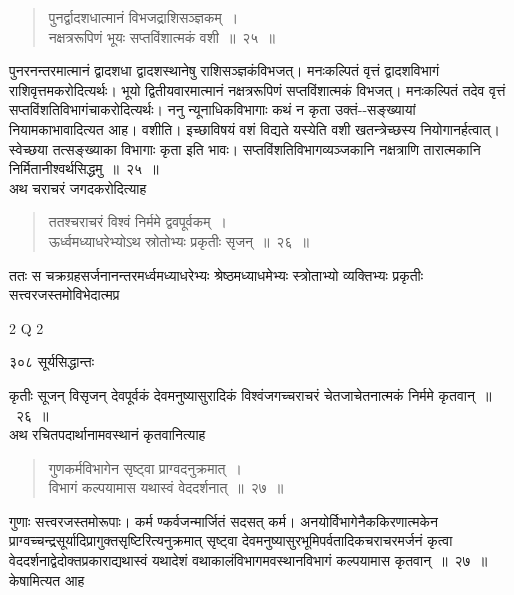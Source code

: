 \documentclass[11pt, openany]{book}
\begin{document}
 \begin{quote}
{\ssi पुनर्द्वादशधात्मानं विभजद्राशिसञ्ज्ञकम्~।\\
नक्षत्ररूपिणं भूयः सप्तविंशात्मकं वशी~॥~२५~॥}
\end{quote}

 पुनरनन्तरमात्मानं द्वादशधा द्वादशस्थानेषु राशिसञ्ज्ञकंविभजत्। मनःकल्पितं वृत्तं द्वादशविभागं राशिवृत्तमकरोदित्यर्थः। भूयो द्वितीयवारमात्मानं नक्षत्ररूपिणं सप्तविंशात्मकं विभजत्। मनःकल्पितं तदेव वृत्तं सप्तविंशतिविभागंचाकरोदित्यर्थः। ननु न्यूनाधिकविभागाः कथं न कृता उक्तं-\/-सङ्ख्यायां नियामकाभावादित्यत आह। वशीति। इच्छाविषयं वशं विद्यते यस्येति वशी खतन्त्रेच्छस्य नियोगानर्हत्वात्। स्वेच्छया तत्सङ्ख्याका विभागाः कृता इति भावः। सप्तविंशतिविभागव्यञ्जकानि नक्षत्राणि तारात्मकानि निर्मितानीश्वर्थसिद्धमु~॥~२५~॥\\
\noindent अथ चराचरं जगदकरोदित्याह \textendash

\begin{quote}
{\ssi ततश्चराचरं विश्वं निर्ममे द्ववपूर्वकम्~।\\
ऊर्ध्वमध्याधरेभ्योऽथ स्रोतोभ्यः प्रकृतीः सृजन्~॥~२६~॥ }
\end{quote}
 ततः स चक्रग्रहसर्जनानन्तरमर्ध्वमध्याधरेभ्यः श्रेष्ठमध्याधमेभ्यः स्त्रोताभ्यो व्यक्तिभ्यः प्रकृतीः सत्त्वरजस्तमोविभेदात्मप्र \textendash


{\tiny{2 Q 2}}


\newpage


\noindent ३०८ \hspace{3cm} सूर्यसिद्धान्तः
\vspace{1cm}


\noindent कृतीः सूजन् विसृजन् देवपूर्वकं देवमनुष्यासुरादिकं विश्वंजगच्चराचरं चेतजाचेतनात्मकं निर्ममे कृतवान्~॥~२६~॥ \\
\noindent अथ रचितपदार्थानामवस्थानं कृतवानित्याह \textendash

\begin{quote}
{\ssi गुणकर्मविभागेन सृष्ट्वा प्राग्वदनुक्रमात्~। \\
विभागं कल्पयामास यथास्वं वेददर्शनात्~॥~२७~॥ }
\end{quote}
 गुणाः सत्त्वरजस्तमोरूपाः। कर्म ण्कर्वजन्मार्जितं सदसत् कर्म। अनयोर्विभागेनैककिरणात्मकेन प्राग्वच्चन्द्रसूर्यादिप्रागुक्तसृष्टिरित्यनुक्रमात् सृष्ट्वा देवमनुष्यासुरभूमिपर्वतादिकचराचरमर्जनं कृत्वा वेददर्शनाद्वेदोक्तप्रकाराद्यथास्वं यथादेशं वथाकालंविभागमवस्थानविभागं कल्पयामास कृतवान्~॥~२७~॥\\ 
\noindent केषामित्यत आह  \textendash
\end{document}
